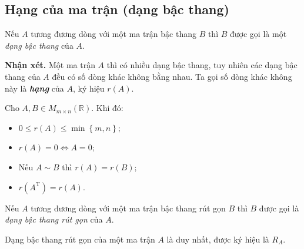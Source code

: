 \subsection{Hạng của ma trận (dạng bậc thang)}
Nếu $A$ tương đương dòng với một ma trận bậc thang $B$ thì $B$ được gọi là một \textit{dạng bậc thang} của $A.$
\begin{mybox}
\textbf{Nhận xét.} Một ma trận $A$ thì có nhiều dạng bậc thang, tuy nhiên các dạng bậc thang của $A$ đều có số dòng khác không bằng nhau. Ta gọi số dòng khác không này là \textit{\textbf{hạng}} của $A$, ký hiệu $r \left( A \right).$
\end{mybox}
\begin{mybox}
Cho $A, B \in M_{m \times n} \left( {\mathbb{R}} \right).$ Khi đó:
\begin{itemize}
\item $0 \leqslant r \left( A \right) \leqslant \min \left\{ {m, n} \right\};$
\item $r \left( A \right) = 0 \Leftrightarrow A = 0;$
\item Nếu $A \sim B$ thì $r \left( A \right) = r \left( B \right);$
\item $r \left( {A^{\mathrm{T}}} \right) = r \left( A \right).$
\end{itemize}
\end{mybox}
Nếu $A$ tương đương dòng với một ma trận bậc thang rút gọn $B$ thì $B$ được gọi là \textit{dạng bậc thang rút gọn} của $A.$
\begin{mybox}
\begin{theorem}
Dạng bậc thang rút gọn của một ma trận $A $ là duy nhất, được ký hiệu là $R_A.$
\end{theorem}
\end{mybox}
